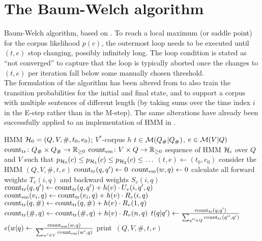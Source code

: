 \section{The Baum-Welch algorithm}

\begin{algorithm}[p!]
 \caption{Baum-Welch algorithm, based on \cite[p.~226]{jm09}. To reach a local
 maximum (or saddle point) for the corpus likelihood $p(c)$, the outermost loop
 needs to be executed until $(t,e)$ stop changing, possibly infinitely long.
 The loop condition is stated as ``not converged'' to capture that the loop is
 typically aborted once the changes to $(t,e)$ per iteration fall below some
 manually chosen threshold.\\[1em]
 The formulation of the algorithm has been altered from \cite{jm09} to also
 train the transition probabilities for the initial and final state, and to
 support a corpus with multiple sentences of different length (by taking sums
 over the time index $i$ in the E-step rather than in the M-step). The same
 alterations have already been successfully applied to an implementation of HMM
 in \cite{nel13}. \label{alg:bw-vogler}}
 \begin{algorithmic}[1]
  \algorithmheader[Input:] HMM $\mathcal H_0 = (Q,V,\#,t_0,e_0)$; $V^*$-corpus $h$
  \algorithmheader[Variables:] $t\in\mathcal M(Q_\#|Q_\#)$, $e\in\mathcal M(V|Q)$
  \algorithmheader             $\operatorname{count}_\mathrm{tr}\colon Q_\#\times Q_\#\to\mathbb R_{\geq0}$
  \algorithmheader             $\operatorname{count}_\mathrm{em}\colon V\times Q\to\mathbb R_{\geq0}$
  \algorithmheader[Output:] sequence of HMM $\mathcal H_i$ over $Q$ and $V$
  \algorithmheader such that $p_{\mathcal H_0}(c) \leq p_{\mathcal H_1}(c) \leq p_{\mathcal H_2}(c) \leq \ldots$
  \STATE $(t,e) \leftarrow (t_0,e_0)$
   \STATE consider the HMM $(Q,V,\#,t,e)$
   \STATE $\operatorname{count}_\mathrm{tr}(q,q') \leftarrow 0$ 
   \STATE $\operatorname{count}_\mathrm{em}(w,q) \leftarrow 0$ 
    \STATE calculate all forward weights $T_v(i,q)$ and backward weights $S_v(i,q)$
      \STATE $\operatorname{count}_\mathrm{tr}(q,q') \leftarrow \operatorname{count}_\mathrm{tr}(q,q') + h(v) \cdot U_v(i,q',q)$
     \ENDFOR
    \ENDFOR
      \STATE $\operatorname{count}_\mathrm{em}(v_i,q) \leftarrow \operatorname{count}_\mathrm{tr}(v_i,q) + h(v) \cdot R_v(i,q)$
     \ENDFOR
    \ENDFOR
     \STATE $\operatorname{count}_\mathrm{tr}(q,\#) \leftarrow \operatorname{count}_\mathrm{tr}(q,\#) + h(v) \cdot R_v(1,q)$
     \STATE $\operatorname{count}_\mathrm{tr}(\#,q) \leftarrow \operatorname{count}_\mathrm{tr}(\#,q) + h(v) \cdot R_v(n,q)$
    \ENDFOR
   \ENDFOR
    \STATE $t(q|q') \leftarrow \frac{\operatorname{count}_\mathrm{tr}(q,q')}{\sum_{q''\in Q} \operatorname{count}_\mathrm{tr}(q'',q')}$
   \ENDFOR
    \STATE $e(w|q) \leftarrow \frac{\operatorname{count}_\mathrm{em}(w,q)}{\sum_{w'\in V} \operatorname{count}_\mathrm{em}(w',q)}$
   \ENDFOR
   \STATE print~$(Q,V,\#,t,e)$
  \ENDWHILE
 \end{algorithmic}
\end{algorithm}

